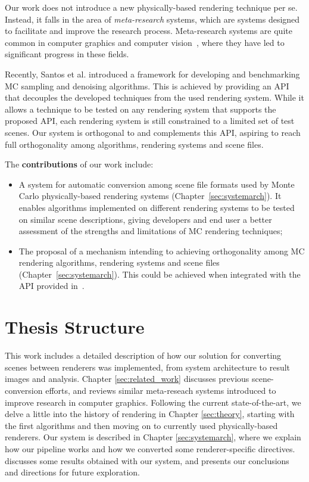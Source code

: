 Our work does not introduce a new physically-based rendering technique per se. Instead, it falls in the area of {\it meta-research} systems, which are systems 
designed to facilitate and improve the research process. Meta-research systems are quite common in computer graphics and computer vision~\cite{MiddleburyStereo, MiddleburyFlow, AlphaMatting, VideoMatting}, where they have led to significant progress in these fields. 
  
Recently, Santos et al. \cite{Santos:2018:FBKSD} introduced a framework for developing and benchmarking MC sampling and denoising algorithms. This is achieved by providing an API that decouples the developed techniques from the used rendering system. 
While it allows a technique to be tested on any rendering system that supports the proposed API, each rendering system is still constrained to a limited set of test scenes. Our system is orthogonal to and complements this API, aspiring to reach full orthogonality among algorithms, rendering systems and scene files.

The {\bf contributions} of our work include:
\begin{itemize}
	\item A system for automatic conversion among scene file formats used by Monte Carlo physically-based rendering systems (Chapter~\ref{sec:systemarch}).
	It enables algorithms implemented on different rendering systems to be tested on similar scene descriptions, giving developers and end user a better 
assessment of the strengths and limitations of MC rendering techniques;
	\item The proposal of a mechanism intending to achieving orthogonality among MC rendering algorithms, rendering systems and scene files (Chapter~\ref{sec:systemarch}). 
This could be achieved when integrated with the API provided in~\cite{Santos:2018:FBKSD}. 
\end{itemize}

\section{Thesis Structure}

This work includes a detailed description of how our solution for converting scenes between renderers was implemented, from system architecture to result images and analysis. Chapter \ref{sec:related_work} discusses previous scene-conversion efforts, and reviews 
similar meta-reseach systems introduced to improve research in computer graphics.
Following the current state-of-the-art, we delve a little into the history of rendering in Chapter \ref{sec:theory}, starting with the first algorithms and then moving on to currently used physically-based renderers.
%
Our system is described in Chapter \ref{sec:systemarch}, where we explain how our pipeline works and how we converted some renderer-specific directives.  discusses some results obtained with our system, and   presents our conclusions and directions for future exploration.


